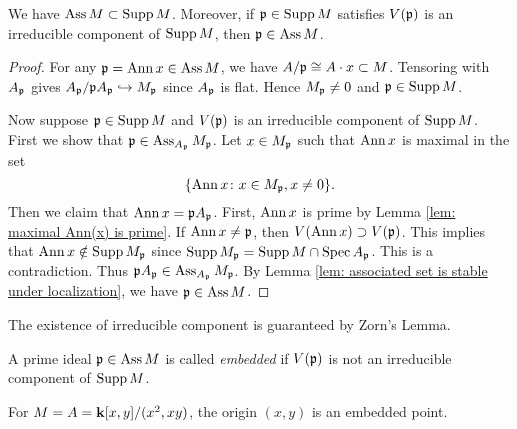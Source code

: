         \begin{proposition}\label{prop: Ass is subset of Supp}
            We have $\operatorname{Ass} M \subset \operatorname{Supp} M$.
            Moreover, if ${\mathfrak{p}} \in \operatorname{Supp} M$ satisfies $V({\mathfrak{p}})$ is an irreducible component of $\operatorname{Supp} M$, then ${\mathfrak{p}} \in \operatorname{Ass} M$.
        \end{proposition}
        \begin{proof}
            For any ${\mathfrak{p}} = \operatorname{Ann} x \in \operatorname{Ass} M$, we have $A/{\mathfrak{p}} \cong A \cdot x \subset M$.
            Tensoring with $A_{\mathfrak{p}}$ gives $A_{\mathfrak{p}}/{\mathfrak{p}} A_{\mathfrak{p}} \hookrightarrow M_{\mathfrak{p}}$ since $A_{\mathfrak{p}}$ is flat.
            Hence $M_{\mathfrak{p}} \neq 0$ and ${\mathfrak{p}} \in \operatorname{Supp} M$.

            Now suppose ${\mathfrak{p}} \in \operatorname{Supp} M$ and $V({\mathfrak{p}})$ is an irreducible component of $\operatorname{Supp} M$.
            First we show that ${\mathfrak{p}} \in \operatorname{Ass}_{A_{\mathfrak{p}}} M_{\mathfrak{p}}$.
            Let $x \in M_{\mathfrak{p}}$ such that $\operatorname{Ann} x$ is maximal in the set 
            \[ \{ \operatorname{Ann} x \colon x \in M_{\mathfrak{p}}, x \neq 0 \}. \]
            Then we claim that $\operatorname{Ann} x = {\mathfrak{p}} A_{\mathfrak{p}}$.
            First, $\operatorname{Ann} x$ is prime by Lemma \ref{lem: maximal Ann(x) is prime}.
            If $\operatorname{Ann} x \neq {\mathfrak{p}}$, then $V(\operatorname{Ann} x) \supset V({\mathfrak{p}})$.
            This implies that $\operatorname{Ann} x \notin \operatorname{Supp} M_{\mathfrak{p}}$ since $\operatorname{Supp} M_{\mathfrak{p}} = \operatorname{Supp} M \cap \operatorname{Spec} A_{\mathfrak{p}}$.
            This is a contradiction.
            Thus ${\mathfrak{p}} A_{\mathfrak{p}} \in \operatorname{Ass}_{A_{\mathfrak{p}}} M_{\mathfrak{p}}$.
            By Lemma \ref{lem: associated set is stable under localization}, we have ${\mathfrak{p}} \in \operatorname{Ass} M$. 
        \end{proof}

        \begin{remark}
            The existence of irreducible component is guaranteed by Zorn's Lemma.
        \end{remark}

        \begin{definition}\label{def: embedded prime}
            A prime ideal ${\mathfrak{p}} \in \operatorname{Ass} M$ is called \textit{embedded} if $V({\mathfrak{p}})$ is not an irreducible component of $\operatorname{Supp} M$.
        \end{definition}

        \begin{example}
            For $M = A = {\mathbf{k}}[x,y]/(x^2,xy)$, the origin $(x,y)$ is an embedded point.
        \end{example}


